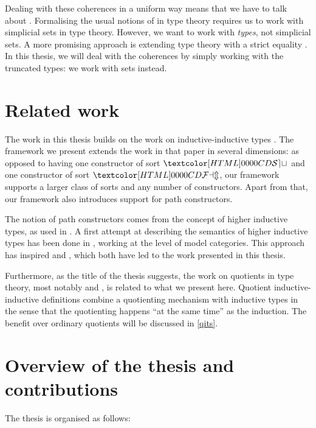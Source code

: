 Dealing with these coherences in a uniform way means that we have to
talk about \inftycats \cite{Camarena2013}. Formalising the usual
notions of \inftycat in type theory requires us to work with
simplicial sets in type theory. However, we want to work with
\emph{types}, not simplicial sets. A more promising approach is
extending type theory with a strict equality
\cite{Altenkirch2016ii,Altenkirch2016iii}. In this thesis, we will
deal with the coherences by simply working with the truncated types:
we work with sets instead.

\section{Related work}

The work in this thesis builds on the work on inductive-inductive
types \cite{Altenkirch2011}. The framework we present extends the work
in that paper in several dimensions: as opposed to having one
constructor of sort $\SET$ and one constructor of sort $\FAM$, our
framework supports a larger class of sorts and any number of
constructors. Apart from that, our framework also introduces support
for path constructors.

The notion of path constructors comes from the concept of higher
inductive types, as used in \cite{UFP2013}. A first attempt at
describing the semantics of higher inductive types has been done in
\cite{Lumsdaine2013}, working at the level of model categories. This
approach has inspired \cite{Capriotti2014ii} and
\cite{Altenkirch2015ii}, which both have led to the work presented in
this thesis.

Furthermore, as the title of the thesis suggests, the work on
quotients in type theory, most notably \cite{Nuo2015} and
\cite{Hofmann1995}, is related to what we present here. Quotient
inductive-inductive definitions combine a quotienting mechanism with
inductive types in the sense that the quotienting happens ``at the
same time'' as the induction. The benefit over ordinary quotients will
be discussed in \cref{qits}.

\section{Overview of the thesis and contributions}

The thesis is organised as follows:

